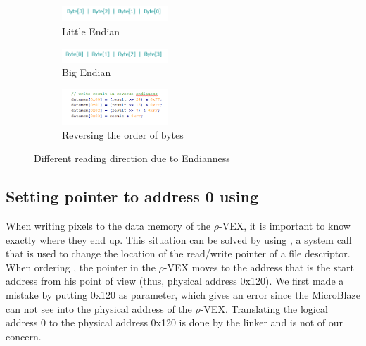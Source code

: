 \begin{figure}
	\centering
	\begin{subfigure} [h] {0.5\textwidth}
		\centering
		\includegraphics[width=150px]{Pictures/little}
		\caption{Little Endian}
		\label{fig:little}
	\end{subfigure}
	\quad
	\begin{subfigure} [h] {0.5\textwidth}
		\centering
		\includegraphics[width=150px]{Pictures/big}
		\caption{Big Endian}
		\label{fig:big}
	\end{subfigure}
	\quad
	\begin{subfigure} [h] {0.5\textwidth}
		\centering
		\includegraphics[width=150px]{Pictures/byteswap}
		\caption{Reversing the order of bytes}
		\label{fig:swap}
	\end{subfigure}
\caption{Different reading direction due to Endianness}%
\label{}%
\end{figure}

\subsection{Setting pointer to address 0 using }

When writing pixels to the data memory of the $\rho$-VEX, it is important to know exactly where they end up. This situation can be solved by using , a system call that is used to change the location of the read/write pointer of a file descriptor. When ordering , the pointer in the $\rho$-VEX moves to the address that is the start address from his point of view (thus, physical address 0x120). We first made a mistake by putting 0x120 as  parameter, which gives an error since the MicroBlaze can not see into the physical address of the $\rho$-VEX. Translating the logical address 0 to the physical address 0x120 is done by the linker and is not of our concern.

